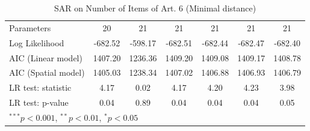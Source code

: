 \begin{table}[!h]
\begin{center}
\begin{tabular}{l c c c c c c }
Parameters              & 20           & 21            & 21           & 21           & 21           & 21           \\
Log Likelihood          & -682.52      & -598.17       & -682.51      & -682.44      & -682.47      & -682.40      \\
AIC (Linear model)      & 1407.20      & 1236.36       & 1409.20      & 1409.08      & 1409.17      & 1408.78      \\
AIC (Spatial model)     & 1405.03      & 1238.34       & 1407.02      & 1406.88      & 1406.93      & 1406.79      \\
LR test: statistic      & 4.17         & 0.02          & 4.17         & 4.20         & 4.23         & 3.98         \\
LR test: p-value        & 0.04         & 0.89          & 0.04         & 0.04         & 0.04         & 0.05         \\
\bottomrule
\multicolumn{7}{l}{\scriptsize{$^{***}p<0.001$, $^{**}p<0.01$, $^*p<0.05$}}
\end{tabular}
\caption{SAR on Number of Items of Art. 6 (Minimal distance)}
\label{table:coefficients}
\end{center}
\end{table}
